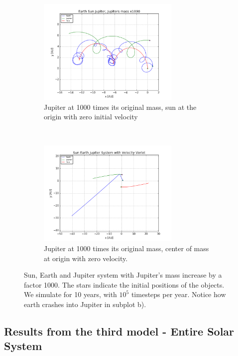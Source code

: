 \documentclass[a4paper, 10pt]{article}
\begin{document}
\begin{figure}[!ht]
    \centering
    \begin{subfigure}[H!]{0.5\textwidth}
        \centering
        \includegraphics[height=2.0in]{orbitESJ1000.png}
        \caption{Jupiter at 1000 times its original mass, sun at the origin with zero initial velocity}
    \end{subfigure}%
    ~ 
    \begin{subfigure}[H!]{0.5\textwidth}
        \centering
        \includegraphics[height=2.0in]{orbitSEJMCAtOri.png}
        \caption{Jupiter at 1000 times its original mass, center of mass at origin with zero velocity.}
    \end{subfigure}
    \caption{Sun, Earth and Jupiter system with Jupiter's mass increase by a factor 1000. The stars indicate the initial positions of the objects. We simulate for 10 years, with $10^5$ timesteps per year. Notice how earth crashes into Jupiter in subplot b).}\label{fig:Jupiter1000}
\end{figure}

\newpage

\subsection{Results from the third model - Entire Solar System}
\end{document}
